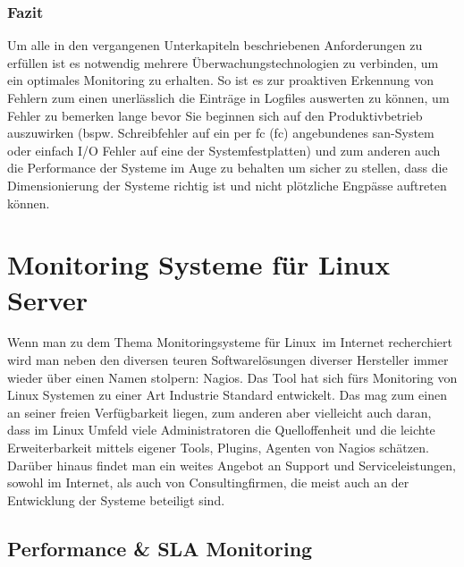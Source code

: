 \documentclass[12pt,a4paper,parskip]{scrreprt}
\begin{document}
	\subsection{Fazit}
	Um alle in den vergangenen Unterkapiteln beschriebenen Anforderungen zu erfüllen ist es notwendig mehrere Überwachungstechnologien zu verbinden, um ein optimales Monitoring zu erhalten. So ist es zur proaktiven Erkennung von Fehlern zum einen unerlässlich die Einträge in Logfiles auswerten zu können, um Fehler zu bemerken lange bevor Sie beginnen sich auf den Produktivbetrieb auszuwirken (bspw. Schreibfehler auf ein per \acrlong{fc} (\acrshort{fc}) angebundenes \gls{san}-System oder einfach I/O Fehler auf eine der Systemfestplatten) und zum anderen auch die Performance der Systeme im Auge zu behalten um sicher zu stellen, dass die Dimensionierung der Systeme richtig ist und nicht plötzliche Engpässe auftreten können.
	\chapter{Monitoring Systeme für Linux Server}
	Wenn man zu dem Thema \glqq Monitoringsysteme für Linux\grqq\ im Internet recherchiert wird man neben den diversen teuren Softwarelösungen diverser Hersteller immer wieder über einen Namen stolpern: Nagios. Das Tool hat sich fürs Monitoring von Linux Systemen zu einer Art Industrie Standard entwickelt. Das mag zum einen an seiner freien Verfügbarkeit liegen, zum anderen aber vielleicht auch daran, dass im Linux Umfeld viele Administratoren die Quelloffenheit und die leichte Erweiterbarkeit mittels eigener Tools, Plugins, Agenten von Nagios schätzen. Darüber hinaus findet man ein weites Angebot an Support und Serviceleistungen, sowohl im Internet, als auch von Consultingfirmen, die meist auch an der Entwicklung der Systeme beteiligt sind.
	
	
	\section{Performance \& SLA Monitoring}
\end{document}
